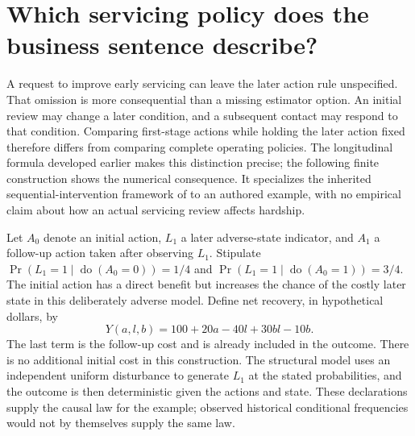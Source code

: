 \section{Which servicing policy does the business sentence describe?}
\label{exec17:l2-policy}

A request to improve early servicing can leave the later action rule
unspecified. That omission is more consequential than a missing estimator
option. An initial review may change a later condition, and a subsequent
contact may respond to that condition. Comparing first-stage actions while
holding the later action fixed therefore differs from comparing complete
operating policies. The longitudinal formula developed earlier makes this
distinction precise; the following finite construction shows the numerical
consequence. It specializes the inherited sequential-intervention framework
of \citet{hernan2020} to an authored example, with no empirical claim about
how an actual servicing review affects hardship.

Let $A_0$ denote an initial action, $L_1$ a later adverse-state indicator,
and $A_1$ a follow-up action taken after observing $L_1$. Stipulate
$\Pr(L_1=1\mid\operatorname{do}(A_0=0))=1/4$ and
$\Pr(L_1=1\mid\operatorname{do}(A_0=1))=3/4$. The initial action has a
direct benefit but increases the chance of the costly later state in this
deliberately adverse model. Define net recovery, in hypothetical dollars, by
\begin{equation}
 Y(a,l,b)=100+20a-40l+30bl-10b.
 \label{exec17:l2-sequential-reward}
\end{equation}
The last term is the follow-up cost and is already included in the outcome.
There is no additional initial cost in this construction. The structural
model uses an independent uniform disturbance to generate $L_1$ at the
stated probabilities, and the outcome is then deterministic given the
actions and state. These declarations supply the causal law for the example;
observed historical conditional frequencies would not by themselves supply
the same law.

